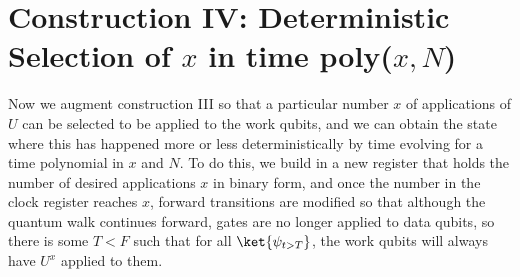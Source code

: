 \documentclass[11pt,letterpaper]{article}
\newcommand{\<}{\langle}
\renewcommand{\>}{\rangle}
\begin{document}
\section{Construction IV: Deterministic Selection of $x$ in time {\rm{poly}}($x,N$)}\label{coniv}
Now we augment construction III so that a particular number $x$ of applications of $U$ can be selected to be applied to the work qubits, and we can obtain the state where this has happened more or less deterministically by time evolving for a time polynomial in $x$ and $N$. To do this, we build in a new register that holds the number of desired applications $x$ in binary form, and once the number in the clock register reaches $x$, forward transitions are modified so that although the quantum walk continues forward, gates are no longer applied to data qubits, so there is some $T<F$ such that for all $\ket{\psi_{t>T}}$, the work qubits will always have $U^x$ applied to them.
\end{document}
